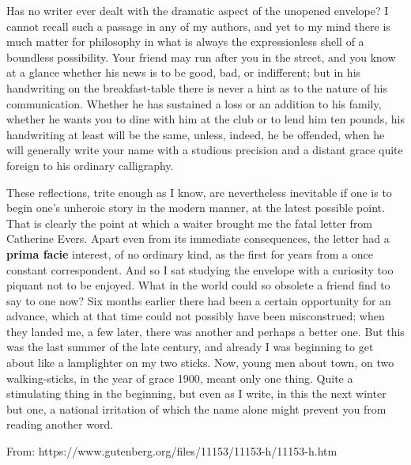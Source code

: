 \begin{linenumbers*}
\modulolinenumbers[5] 
\indent Has no writer ever dealt with the dramatic aspect of the unopened envelope? I cannot recall such a passage in any of my authors, and yet to my mind there is much matter for philosophy in what is always the expressionless shell of a boundless possibility. Your friend may run after you in the street, and you know at a glance whether his news is to be good, bad, or indifferent; but in his handwriting on the breakfast-table there is never a hint as to the nature of his communication. Whether he has sustained a loss or an addition to his family, whether he wants you to dine with him at the club or to lend him ten pounds, his handwriting at least will be the same, unless, indeed, he be offended, when he will generally write your name with a studious precision and a distant grace quite foreign to his ordinary calligraphy.

\indent These reflections, trite enough as I know, are nevertheless inevitable if one is to begin one's unheroic story in the modern manner, at the latest possible point. That is clearly the point at which a waiter brought me the fatal letter from Catherine Evers. Apart even from its immediate consequences, the letter had a \textbf{prima facie} interest, of no ordinary kind, as the first for years from a once constant correspondent. And so I sat studying the envelope with a curiosity too piquant not to be enjoyed. What in the world could so obsolete a friend find to say to one now? Six months earlier there had been a certain opportunity for an advance, which at that time could not possibly have been misconstrued; when they landed me, a few later, there was another and perhaps a better one. But this was the last summer of the late century, and already I was beginning to get about like a lamplighter on my two sticks. Now, young men about town, on two walking-sticks, in the year of grace 1900, meant only one thing. Quite a stimulating thing in the beginning, but even as I write, in this the next winter but one, a national irritation of which the name alone might prevent you from reading another word.
\end{linenumbers*}

From: https://www.gutenberg.org/files/11153/11153-h/11153-h.htm

